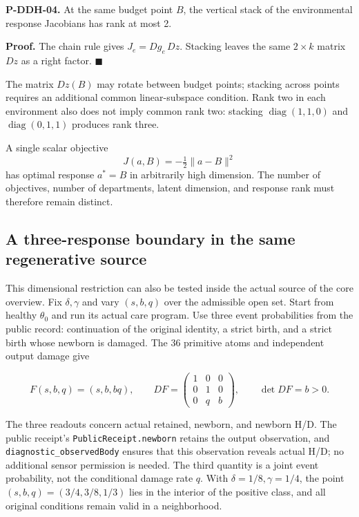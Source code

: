 \documentclass[
  english,
  11pt,
  oneside]{book}
\begin{document}
\textbf{P-DDH-04.} At the same budget point \(B\), the vertical stack of the environmental response Jacobians has rank at most 2.

\textbf{Proof.} The chain rule gives \(J_e=Dg_e\,Dz\). Stacking leaves the same \(2\times k\) matrix \(Dz\) as a right factor. \(\blacksquare\)

The matrix \(Dz(B)\) may rotate between budget points; stacking across points requires an additional common linear-subspace condition. Rank two in each environment also does not imply common rank two: stacking \(\operatorname{diag}(1,1,0)\) and \(\operatorname{diag}(0,1,1)\) produces rank three.

A single scalar objective \[J(a,B)=-\tfrac12\|a-B\|^2\] has optimal response \(a^*=B\) in arbitrarily high dimension. The number of objectives, number of departments, latent dimension, and response rank must therefore remain distinct.

\subsection{A three-response boundary in the same regenerative source}\label{a-three-response-boundary-in-the-same-regenerative-source}

This dimensional restriction can also be tested inside the actual source of the core overview. Fix \(\delta,\gamma\) and vary \((s,b,q)\) over the admissible open set. Start from healthy \(\theta_0\) and run its actual care program. Use three event probabilities from the public record: continuation of the original identity, a strict birth, and a strict birth whose newborn is damaged. The 36 primitive atoms and independent output damage give

\[F(s,b,q)=(s,b,bq),\qquad
DF=\begin{pmatrix}1&0&0\\0&1&0\\0&q&b\end{pmatrix},\qquad
\det DF=b>0.\]

The three readouts concern actual retained, newborn, and newborn H/D. The public receipt's \nolinkurl{PublicReceipt.newborn} retains the output observation, and \nolinkurl{diagnostic_observedBody} ensures that this observation reveals actual H/D; no additional sensor permission is needed. The third quantity is a joint event probability, not the conditional damage rate \(q\). With \(\delta=1/8,\gamma=1/4\), the point \((s,b,q)=(3/4,3/8,1/3)\) lies in the interior of the positive class, and all original conditions remain valid in a neighborhood.
\end{document}
